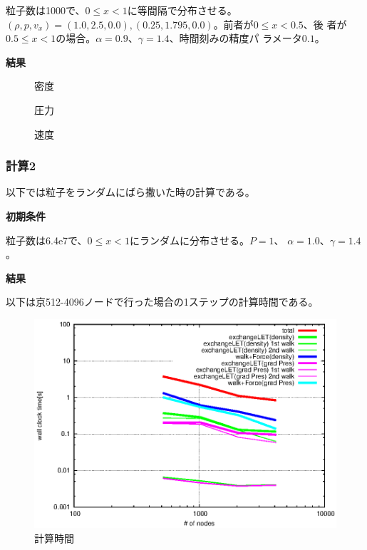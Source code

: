 粒子数は1000で、$0 \le x < 1$に等間隔で分布させる。$(\rho, p,
v_{x})=(1.0, 2.5, 0.0), (0.25, 1.795, 0.0)$。前者が$0 \le x < 0.5$、後
者が$0.5 \le x < 1$の場合。$\alpha=0.9$、$\gamma=1.4$、時間刻みの精度パ
ラメータ$0.1$。

{\bf 結果}

\begin{figure}
  \begin{center}
  \end{center}
  \caption{密度}
  \label{fig:x-rho}
\end{figure}

\begin{figure}
  \begin{center}
  \end{center}
  \caption{圧力}
  \label{fig:x-p}
\end{figure}

\begin{figure}[h]
  \begin{center}
  \end{center}
  \caption{速度}
  \label{fig:x-vx}
\end{figure}

\subsubsection{計算2}

以下では粒子をランダムにばら撒いた時の計算である。

{\bf 初期条件}

粒子数は6.4e7で、$0 \le x < 1$にランダムに分布させる。$P=1$、
$\alpha=1.0$、$\gamma=1.4$。

{\bf 結果}

以下は京512-4096ノードで行った場合の1ステップの計算時間である。

\begin{figure}
  \begin{center}
    \includegraphics[width=12cm]{fig/tcal_sph_n64M_unirandom.eps}
  \end{center}
  \caption{計算時間}
  \label{fig:tcal_sph_n64M_unirandom}
\end{figure}

